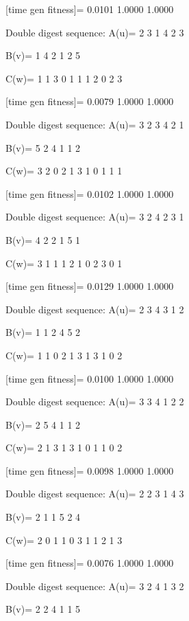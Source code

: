 [time gen fitness]=
    0.0101    1.0000    1.0000

Double digest sequence:
A(u)=
     2     3     1     4     2     3

B(v)=
     1     4     2     1     2     5

C(w)=
     1     1     3     0     1     1     1     2     0     2     3

[time gen fitness]=
    0.0079    1.0000    1.0000

Double digest sequence:
A(u)=
     3     2     3     4     2     1

B(v)=
     5     2     4     1     1     2

C(w)=
     3     2     0     2     1     3     1     0     1     1     1

[time gen fitness]=
    0.0102    1.0000    1.0000

Double digest sequence:
A(u)=
     3     2     4     2     3     1

B(v)=
     4     2     2     1     5     1

C(w)=
     3     1     1     1     2     1     0     2     3     0     1

[time gen fitness]=
    0.0129    1.0000    1.0000

Double digest sequence:
A(u)=
     2     3     4     3     1     2

B(v)=
     1     1     2     4     5     2

C(w)=
     1     1     0     2     1     3     1     3     1     0     2

[time gen fitness]=
    0.0100    1.0000    1.0000

Double digest sequence:
A(u)=
     3     3     4     1     2     2

B(v)=
     2     5     4     1     1     2

C(w)=
     2     1     3     1     3     1     0     1     1     0     2

[time gen fitness]=
    0.0098    1.0000    1.0000

Double digest sequence:
A(u)=
     2     2     3     1     4     3

B(v)=
     2     1     1     5     2     4

C(w)=
     2     0     1     1     0     3     1     1     2     1     3

[time gen fitness]=
    0.0076    1.0000    1.0000

Double digest sequence:
A(u)=
     3     2     4     1     3     2

B(v)=
     2     2     4     1     1     5

